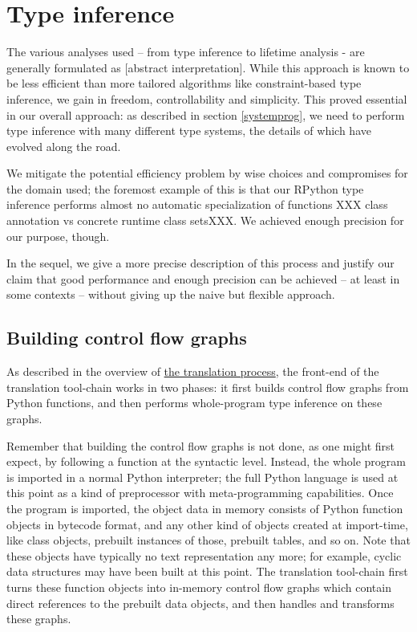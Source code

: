 \documentclass{acm_proc_article-sp}
\begin{document}
\section{Type inference}
\label{typeinference}


The various analyses used -- from type inference to lifetime analysis -
are generally formulated as [abstract interpretation].  While this
approach is known to be less efficient than more tailored algorithms
like constraint-based type inference, we gain in freedom,
controllability and simplicity.  This proved essential in our overall
approach: as described in section \ref{systemprog}, we need to perform
type inference with many different type systems, the details of which
have evolved along the road.

We mitigate the potential efficiency problem by wise choices and
compromises for the domain used; the foremost example of this is that
our RPython type inference performs almost no automatic specialization
of functions XXX class annotation vs concrete runtime class setsXXX.
We achieved enough precision for our purpose, though.

In the sequel, we give a more precise description of this process and
justify our claim that good performance and enough precision can be
achieved -- at least in some contexts -- without giving up the naive but
flexible approach.


\subsection{Building control flow graphs}
\label{flowobjspace}
\hypertarget{flowobjspace}{}

As described in the overview of \href{\#the-translation-process}{the
translation process}, the front-end of the translation tool-chain
works in two phases: it first builds control flow graphs from Python
functions, and then performs whole-program type inference on these
graphs.

Remember that building the control flow graphs is not done, as one might
first expect, by following a function at the syntactic level.  Instead,
the whole program is imported in a normal Python interpreter; the full
Python language is used at this point as a kind of preprocessor with
meta-programming capabilities.  Once the program is imported, the object
data in memory consists of Python function objects in bytecode format,
and any other kind of objects created at import-time, like class
objects, prebuilt instances of those, prebuilt tables, and so on.  Note
that these objects have typically no text representation any more; for
example, cyclic data structures may have been built at this point.  The
translation tool-chain first turns these function objects into in-memory
control flow graphs which contain direct references to the prebuilt data
objects, and then handles and transforms these graphs.
\end{document}
